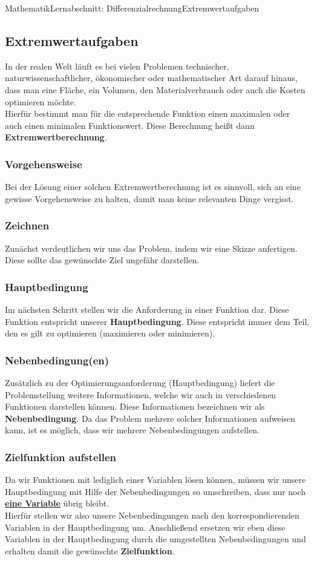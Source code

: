 \documentclass[11pt,twocolumn,oneside,openany,headings=optiontotoc,11pt,numbers=noenddot]{article}
\begin{document}
	\begin{worksheet}{Mathematik}{Lernabschnitt: Differenzialrechnung}{Extremwertaufgaben}
		\setcounter{section}{7}
		\setcounter{subsection}{5}
		\subsection{Extremwertaufgaben}
		In der realen Welt läuft es bei vielen Problemen technischer, naturwissenschaftlicher, ökonomischer oder mathematischer Art darauf hinaus, dass man eine Fläche, ein Volumen, den Materialverbrauch oder auch die Kosten optimieren möchte.\\
		Hierfür bestimmt man für die entsprechende Funktion einen maximalen oder auch einen minimalen Funktionswert. Diese Berechnung heißt dann \textbf{Extremwertberechnung}.
		\subsubsection{Vorgehensweise}
		Bei der Lösung einer solchen Extremwertberechnung ist es sinnvoll, sich an eine gewisse Vorgehensweise zu halten, damit man keine relevanten Dinge vergisst.
		\subsubsection*{Zeichnen}
		Zunächst verdeutlichen wir uns das Problem, indem wir eine Skizze anfertigen. Diese sollte das gewünschte Ziel ungefähr darstellen.
		\subsubsection*{Hauptbedingung}
		Im nächsten Schritt stellen wir die Anforderung in einer Funktion dar. Diese Funktion entspricht unserer \textbf{Hauptbedingung}. Diese entspricht immer dem Teil, den es gilt zu optimieren (maximieren oder minimieren).
		\subsubsection*{Nebenbedingung(en)}
		Zusätzlich zu der Optimierungsanforderung (Hauptbedingung) liefert die Problemstellung weitere Informationen, welche wir auch in verschiedenen Funktionen darstellen können. Diese Informationen bezeichnen wir als \textbf{Nebenbedingung}. Da das Problem mehrere solcher Informationen aufweisen kann, ist es möglich, dass wir mehrere Nebenbedingungen aufstellen.
		\subsubsection*{Zielfunktion aufstellen}
		Da wir Funktionen mit lediglich einer Variablen lösen können, müssen wir unsere Hauptbedingung mit Hilfe der Nebenbedingungen so umschreiben, dass nur noch \underline{\textbf{eine Variable}} übrig bleibt.\\
		Hierfür stellen wir also unsere Nebenbedingungen nach den korrespondierenden Variablen in der Hauptbedingung um. Anschließend ersetzen wir eben diese Variablen in der Hauptbedingung durch die umgestellten Nebenbedingungen und erhalten damit die gewünschte \textbf{Zielfunktion}.

\end{worksheet}
\end{document}
